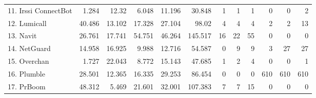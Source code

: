 \begin{table*}[t]
\begin{tabular}{l||r|r|r|r|r||r|r|r||r|r|r}
  11. Irssi ConnectBot       & 1.284                 & 12.32                    & 6.048                      & 11.196                                     & 30.848                                  & 1                           & 1                            & 1                         & 0                           & 0                            & 2                          \\
  12. Lumicall               & 40.486                & 13.102                   & 17.328                     & 27.104                                     & 98.02                                   & 4                           & 4                            & 4                         & 2                           & 2                            & 13                         \\
  13. Navit                  & 26.761                & 17.741                   & 54.751                     & 46.264                                     & 145.517                                 & 16                          & 22                           & 55                        & 0                           & 0                            & 0                          \\
  14. NetGuard               & 14.958                & 16.925                   & 9.988                      & 12.716                                     & 54.587                                  & 0                           & 9                            & 9                         & 3                           & 27                           & 27                         \\
  15. Overchan               & 1.727                 & 22.043                   & 8.772                      & 15.143                                     & 47.685                                  & 1                           & 2                            & 4                         & 0                           & 0                            & 1                          \\
  16. Plumble                & 28.501                & 12.365                   & 16.335                     & 29.253                                     & 86.454                                  & 0                           & 0                            & 0                         & 610                         & 610                          & 610                        \\
  17. PrBoom                 & 48.312                & 5.469                    & 21.601                     & 32.001                                     & 107.383                                 & 7                           & 7                            & 15                        & 0                           & 0                            & 0                          \\

\end{tabular}
\end{table*}
